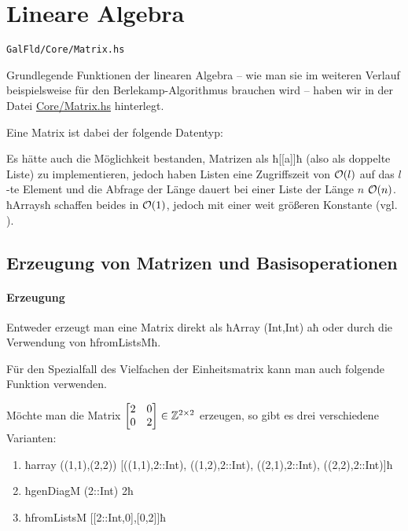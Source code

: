 \section{Lineare Algebra}
\label{sec:linalg}

\texttt{GalFld/Core/Matrix.hs}

Grundlegende Funktionen der linearen Algebra -- wie man sie im weiteren Verlauf
beispielsweise für den Berlekamp-Algorithmus brauchen wird -- haben wir in der
Datei \url{Core/Matrix.hs} hinterlegt.

Eine Matrix ist dabei der folgende Datentyp:


Es hätte auch die Möglichkeit bestanden, Matrizen als ħ[[a]]ħ (also als doppelte
Liste) zu implementieren, jedoch haben Listen eine Zugriffszeit von $\mathcal{O}(l)$ auf
das $l$-te Element und die Abfrage der Länge dauert bei einer Liste der Länge
$n$ $\mathcal{O}(n)$. ħArraysħ schaffen beides in $\mathcal{O}(1)$, jedoch mit einer
weit größeren Konstante (vgl. \url{}). 

\subsection{Erzeugung von Matrizen und Basisoperationen}

\paragraph{Erzeugung} Entweder erzeugt man eine Matrix direkt als
ħArray (Int,Int) aħ oder durch die Verwendung von ħfromListsMħ.


Für den Spezialfall des Vielfachen der Einheitsmatrix kann man auch folgende
Funktion verwenden.


\begin{beispiel}
  Möchte man die Matrix $\begin{bmatrix} 2 & 0 \\ 0 & 2 \end{bmatrix} \in
  \mathbb{Z}^{2\times 2}$
  erzeugen, so gibt es drei verschiedene Varianten:
  \begin{enumerate}
    \item ħarray ((1,1),(2,2)) [((1,1),2::Int), ((1,2),2::Int), ((2,1),2::Int), ((2,2),2::Int)]ħ
    \item ħgenDiagM (2::Int) 2ħ
    \item ħfromListsM [[2::Int,0],[0,2]]ħ
  \end{enumerate}
\end{beispiel}


